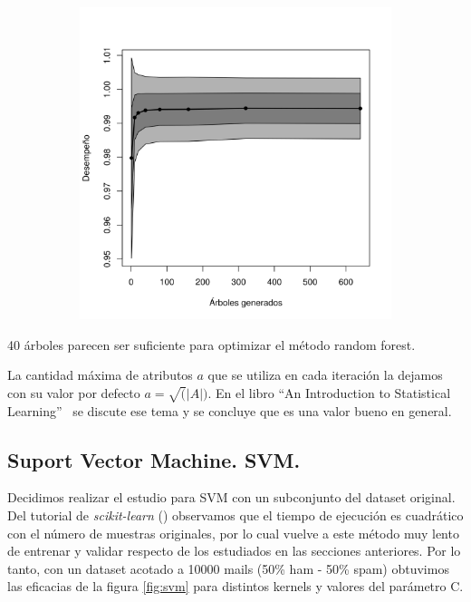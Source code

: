 \documentclass[a4paper,10pt]{article}
\begin{document}
\begin{figure}[H]
  \centering
  \begin{subfigure}[b]{0.4\textwidth}
    \includegraphics[width=\textwidth]{../imagenes/rf_estimators}
     
  \end{subfigure}
   \caption{}
  \label{fig:rf_estimators}
\end{figure}

40 \'arboles parecen ser suficiente para optimizar el m\'etodo random forest.  

La cantidad m\'axima de atributos $a$ que se utiliza en cada iteraci\'on la dejamos con su valor por defecto $a = \sqrt(|A|)$. En el libro ``An Introduction to Statistical Learning''~\cite{james_hastie_tibshirani} se discute ese tema y se concluye que es una valor bueno en general. 


\subsection{Suport Vector Machine. SVM.}

\par Decidimos realizar el estudio para SVM con un subconjunto del dataset original. Del tutorial de \emph{scikit-learn} (\cite{sklearn}) observamos que el tiempo de ejecución es cuadrático con el número de muestras originales, por lo cual vuelve a este método muy lento de entrenar y validar respecto de los estudiados en las secciones anteriores. Por lo tanto, con un dataset acotado a 10000 mails (50\% ham - 50\% spam) obtuvimos las eficacias de la figura \ref{fig:svm} para distintos kernels y valores del parámetro C.
\end{document}

